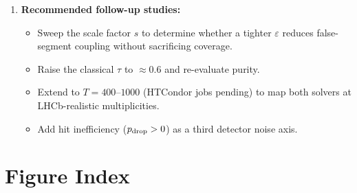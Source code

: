 \documentclass[11pt,a4paper]{article}
\newcommand{\eps}{\varepsilon}
\newcommand{\ntrk}{T}
\begin{document}
\begin{enumerate}
  \item \textbf{Recommended follow-up studies:}
        \begin{itemize}[noitemsep]
          \item Sweep the scale factor $s$ to determine whether a tighter $\eps$
                reduces false-segment coupling without sacrificing coverage.
          \item Raise the classical $\tau$ to $\approx\!0.6$ and re-evaluate purity.
          \item Extend to $\ntrk=400$--$1000$ (HTCondor jobs pending) to map both
                solvers at LHCb-realistic multiplicities.
          \item Add hit inefficiency ($p_{\rm drop}>0$) as a third detector noise axis.
        \end{itemize}

\end{enumerate}

\appendix
\section{Figure Index}
\label{app:figures}
\end{document}

